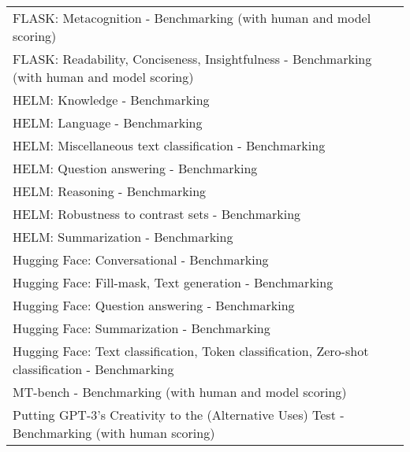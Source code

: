 \documentclass[fleqn]{article}
\begin{document}
\begin{table}[H]
\begin{tabular}{l}
		FLASK: Metacognition - Benchmarking (with human and model scoring) \\
		FLASK: Readability, Conciseness, Insightfulness - Benchmarking (with human and model scoring) \\
		HELM: Knowledge - Benchmarking \\
		HELM: Language - Benchmarking \\
		HELM: Miscellaneous text classification - Benchmarking \\
		HELM: Question answering - Benchmarking \\
		HELM: Reasoning - Benchmarking \\
		HELM: Robustness to contrast sets - Benchmarking \\
		HELM: Summarization - Benchmarking \\
		Hugging Face: Conversational - Benchmarking \\
		Hugging Face: Fill-mask, Text generation - Benchmarking \\
		Hugging Face: Question answering - Benchmarking \\
		Hugging Face: Summarization - Benchmarking \\
		Hugging Face: Text classification, Token classification, Zero-shot classification - Benchmarking \\
		MT-bench - Benchmarking (with human and model scoring) \\
		Putting GPT-3's Creativity to the (Alternative Uses) Test - Benchmarking (with human scoring) \\
		\bottomrule
	\end{tabular}	
\end{table}	

\end{document}
